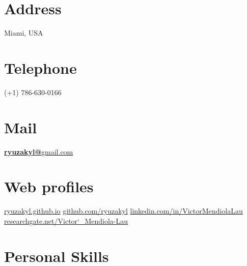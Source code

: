 \documentclass[]{friggeri-cv}
\begin{document}


\begin{aside}
  \section{Address}
    Miami, USA
    ~
    ~
    ~
  \section{Telephone}
    (+1) 786-630-0166
    ~
    ~
    ~
  \section{Mail}
    \href{mailto:ryuzakyl@gmail.com}{\textbf{ryuzakyl@}gmail.com}
	~
	~    
    ~
  \section{Web profiles}
    \href{https://ryuzakyl.github.io}{{\scriptsize ryuzakyl.github.io}}
    \href{https://github.com/ryuzakyl}{{\scriptsize github.com/ryuzakyl}}
    \href{https://www.linkedin.com/in/victormendiolalau}{{\scriptsize linkedin.com/in/VictorMendiolaLau}}
	\href{https://www.researchgate.net/profile/Victor_Mendiola-Lau}{{\scriptsize researchgate.net/Victor\char`_Mendiola-Lau}}
    ~
    ~
    ~
  \section{Personal Skills}
    ~
\end{aside}
\end{document}
